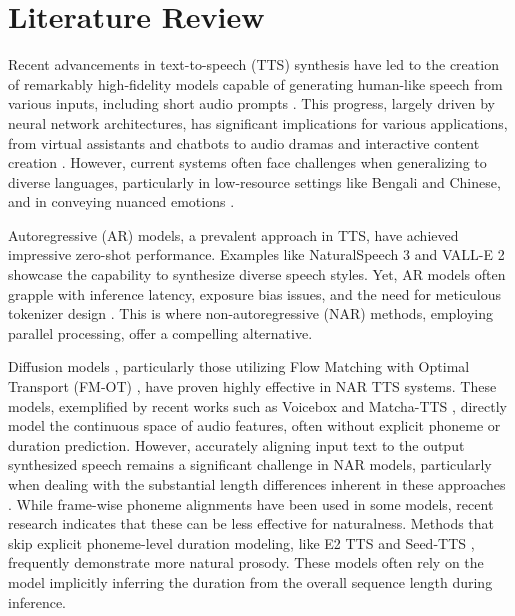 \section*{Literature Review}

Recent advancements in text-to-speech (TTS) synthesis have led to the creation of remarkably high-fidelity models capable of generating human-like speech from various inputs, including short audio prompts \cite{shen2018naturalttssynthesisconditioning,ren2022fastspeech2fasthighquality,kim2020glowttsgenerativeflowtexttospeech,kim2021conditionalvariationalautoencoderadversarial}. This progress, largely driven by neural network architectures, has significant implications for various applications, from virtual assistants and chatbots to audio dramas and interactive content creation \cite{hu2022neuraldubberdubbingvideos,liu2024m3tts}. However, current systems often face challenges when generalizing to diverse languages, particularly in low-resource settings like Bengali and Chinese, and in conveying nuanced emotions \cite{chen2024f5ttsfairytalerfakesfluent, eskimez2024e2ttsembarrassinglyeasy}. \newline


Autoregressive (AR) models, a prevalent approach in TTS, have achieved impressive zero-shot performance. Examples like NaturalSpeech 3 \cite{ju2024naturalspeech3zeroshotspeech} and VALL-E 2 \cite{chen2024valle2neuralcodec} showcase the capability to synthesize diverse speech styles. Yet, AR models often grapple with inference latency, exposure bias issues, and the need for meticulous tokenizer design \cite{song2024ellavstableneuralcodec, du2024valltdecoderonlygenerativetransducer, han2024vallerrobustefficient, peng2024voicecraftzeroshotspeechediting}. This is where non-autoregressive (NAR) methods, employing parallel processing, offer a compelling alternative. \newline

Diffusion models \cite{ho2020denoisingdiffusionprobabilisticmodels}, particularly those utilizing Flow Matching with Optimal Transport (FM-OT) \cite{kornilov2024optimalflowmatchinglearning}, have proven highly effective in NAR TTS systems. These models, exemplified by recent works such as Voicebox \cite{le2023voiceboxtextguidedmultilingualuniversal} and Matcha-TTS \cite{mehta2024matchattsfastttsarchitecture}, directly model the continuous space of audio features, often without explicit phoneme or duration prediction. However, accurately aligning input text to the output synthesized speech remains a significant challenge in NAR models, particularly when dealing with the substantial length differences inherent in these approaches \cite{ju2024naturalspeech3zeroshotspeech}. While frame-wise phoneme alignments have been used in some models, recent research indicates that these can be less effective for naturalness. Methods that skip explicit phoneme-level duration modeling, like E2 TTS \cite{eskimez2024e2ttsembarrassinglyeasy} and Seed-TTS \cite{anastassiou2024seedttsfamilyhighqualityversatile}, frequently demonstrate more natural prosody. These models often rely on the model implicitly inferring the duration from the overall sequence length during inference. \newline

